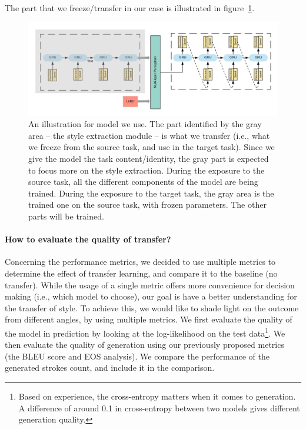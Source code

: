     The part that we freeze/transfer in our case is illustrated in figure~\ref{fig:transfer_part_illustration}.
  \begin{figure}
    \includegraphics[scale=0.95]{./images/sota/transfer_part.jpeg}
    \caption{An illustration for model we use. The part identified by the gray area -- the style extraction module -- is what we transfer (i.e., what we freeze from the source task, and use in the target task). Since we give the model the task content/identity, the gray part is expected to focus more on the style extraction. During the exposure to the source task, all the different components of the model are being trained. During the exposure to the target task, the gray area is the trained one on the source task, with frozen parameters. The other parts will be trained.}
    \label{fig:transfer_part_illustration}
  \end{figure}

  \paragraph{How to evaluate the quality of transfer?} Concerning the performance metrics, we decided to use multiple metrics to determine the effect of transfer learning, and compare it to the baseline (no transfer). While the usage of a single metric offers more convenience for decision making (i.e., which model to choose), our goal is have a better understanding for the transfer of style. To achieve this, we would like to shade light on the outcome from different angles, by using multiple metrics. We first evaluate the quality of the model in prediction by looking at the log-likelihood on the test data\footnote{Based on experience, the cross-entropy matters when it comes to generation. A difference of around 0.1 in cross-entropy between two models gives different generation quality.}. We then evaluate the quality of generation using our previously proposed metrics (the BLEU score and EOS analysis). We compare the performance of the generated strokes count, and include it in the comparison.

